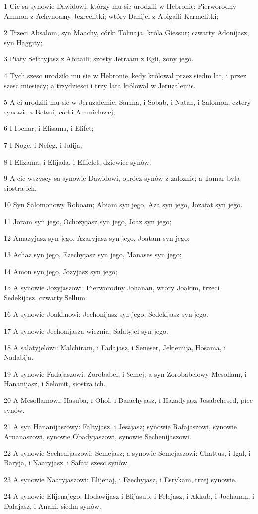 \par 1 Cic sa synowie Dawidowi, którzy mu sie urodzili w Hebronie: Pierworodny Ammon z Achynoamy Jezreelitki; wtóry Danijel z Abigaili Karmelitki;
\par 2 Trzeci Absalom, syn Maachy, córki Tolmaja, króla Giessur; czwarty Adonijasz, syn Haggity;
\par 3 Piaty Sefatyjasz z Abitaili; szósty Jetraam z Egli, zony jego.
\par 4 Tych szesc urodzilo mu sie w Hebronie, kedy królowal przez siedm lat, i przez szesc miesiecy; a trzydziesci i trzy lata królowal w Jeruzalemie.
\par 5 A ci urodzili mu sie w Jeruzalemie; Samna, i Sobab, i Natan, i Salomon, cztery synowie z Betsui, córki Ammielowej;
\par 6 I Ibchar, i Elisama, i Elifet;
\par 7 I Noge, i Nefeg, i Jafija;
\par 8 I Elizama, i Elijada, i Elifelet, dziewiec synów.
\par 9 A cic wszyscy sa synowie Dawidowi, oprócz synów z zaloznic; a Tamar byla siostra ich.
\par 10 Syn Salomonowy Roboam; Abiam syn jego, Aza syn jego, Jozafat syn jego.
\par 11 Joram syn jego, Ochozyjasz syn jego, Joaz syn jego;
\par 12 Amazyjasz syn jego, Azaryjasz syn jego, Joatam syn jego;
\par 13 Achaz syn jego, Ezechyjasz syn jego, Manases syn jego;
\par 14 Amon syn jego, Jozyjasz syn jego;
\par 15 A synowie Jozyjaszowi: Pierworodny Johanan, wtóry Joakim, trzeci Sedekijasz, czwarty Sellum.
\par 16 A synowie Joakimowi: Jechonijasz syn jego, Sedekijasz syn jego.
\par 17 A synowie Jechonijasza wieznia: Salatyjel syn jego.
\par 18 A salatyjelowi: Malchiram, i Fadajasz, i Seneser, Jekiemija, Hosama, i Nadabija.
\par 19 A synowie Fadajaszowi: Zorobabel, i Semej; a syn Zorobabelowy Mesollam, i Hananijasz, i Selomit, siostra ich.
\par 20 A Mesollamowi: Hasuba, i Ohol, i Barachyjasz, i Hazadyjasz Josabchesed, piec synów.
\par 21 A syn Hananijaszowy: Faltyjasz, i Jesajasz; synowie Rafajaszowi, synowie Arnanaszowi, synowie Obadyjaszowi, synowie Sechenijaszowi.
\par 22 A synowie Sechenijaszowi: Semejasz; a synowie Semejaszowi: Chattus, i Igal, i Baryja, i Naaryjasz, i Safat; szesc synów.
\par 23 A synowie Naaryjaszowi: Elijenaj, i Ezechyjasz, i Esrykam, trzej synowie.
\par 24 A synowie Elijenajego: Hodawijasz i Elijasub, i Felejasz, i Akkub, i Jochanan, i Dalajasz, i Anani, siedm synów.


